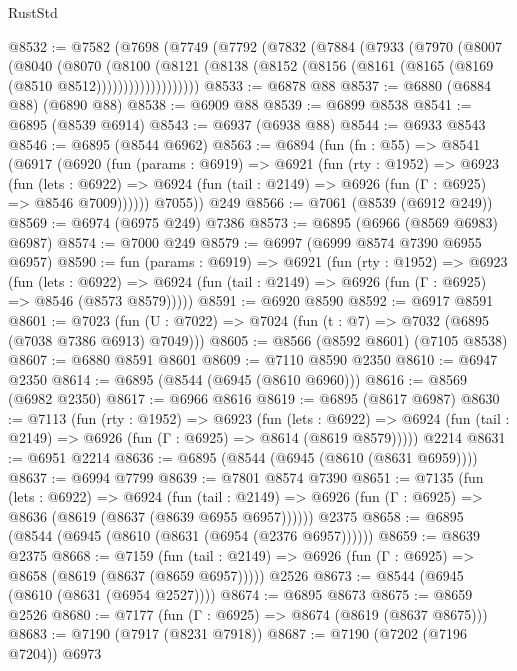 \begin{lexlean}{RustStd}
\begin{coremodule}
@8532 := @7582
    (@7698
      (@7749
        (@7792
          (@7832
            (@7884
              (@7933
                (@7970
                  (@8007
                    (@8040
                      (@8070
                        (@8100
                          (@8121
                            (@8138
                              (@8152 (@8156 (@8161 (@8165 (@8169 (@8510 @8512)))))))))))))))))))
@8533 := @6878 @88
@8537 := @6880 (@6884 @88) (@6890 @88)
@8538 := @6909 @88
@8539 := @6899 @8538
@8541 := @6895 (@8539 @6914)
@8543 := @6937 (@6938 @88)
@8544 := @6933 @8543
@8546 := @6895 (@8544 @6962)
@8563 := @6894
    (fun (fn : @55) =>
    @8541
      (@6917
        (@6920
          (fun (params : @6919) =>
          @6921
            (fun (rty : @1952) =>
            @6923
              (fun (lets : @6922) =>
              @6924 (fun (tail : @2149) => @6926 (fun (Γ : @6925) => @8546 @7009))))))
        @7055))
    @249
@8566 := @7061 (@8539 (@6912 @249))
@8569 := @6974 (@6975 @249) @7386
@8573 := @6895 (@6966 (@8569 @6983) @6987)
@8574 := @7000 @249
@8579 := @6997 (@6999 @8574 @7390 @6955 @6957)
@8590 := fun (params : @6919) =>
  @6921
    (fun (rty : @1952) =>
    @6923
      (fun (lets : @6922) =>
      @6924 (fun (tail : @2149) => @6926 (fun (Γ : @6925) => @8546 (@8573 @8579)))))
@8591 := @6920 @8590
@8592 := @6917 @8591
@8601 := @7023 (fun (U : @7022) => @7024 (fun (t : @7) => @7032 (@6895 (@7038 @7386 @6913) @7049)))
@8605 := @8566 (@8592 @8601) (@7105 @8538)
@8607 := @6880 @8591 @8601
@8609 := @7110 @8590 @2350
@8610 := @6947 @2350
@8614 := @6895 (@8544 (@6945 (@8610 @6960)))
@8616 := @8569 (@6982 @2350)
@8617 := @6966 @8616
@8619 := @6895 (@8617 @6987)
@8630 := @7113
    (fun (rty : @1952) =>
    @6923
      (fun (lets : @6922) =>
      @6924 (fun (tail : @2149) => @6926 (fun (Γ : @6925) => @8614 (@8619 @8579)))))
    @2214
@8631 := @6951 @2214
@8636 := @6895 (@8544 (@6945 (@8610 (@8631 @6959))))
@8637 := @6994 @7799
@8639 := @7801 @8574 @7390
@8651 := @7135
    (fun (lets : @6922) =>
    @6924
      (fun (tail : @2149) => @6926 (fun (Γ : @6925) => @8636 (@8619 (@8637 (@8639 @6955 @6957))))))
    @2375
@8658 := @6895 (@8544 (@6945 (@8610 (@8631 (@6954 (@2376 @6957))))))
@8659 := @8639 @2375
@8668 := @7159
    (fun (tail : @2149) => @6926 (fun (Γ : @6925) => @8658 (@8619 (@8637 (@8659 @6957)))))
    @2526
@8673 := @8544 (@6945 (@8610 (@8631 (@6954 @2527))))
@8674 := @6895 @8673
@8675 := @8659 @2526
@8680 := @7177 (fun (Γ : @6925) => @8674 (@8619 (@8637 @8675)))
@8683 := @7190 (@7917 (@8231 @7918))
@8687 := @7190 (@7202 (@7196 @7204)) @6973

\end{coremodule}
\end{lexlean}
